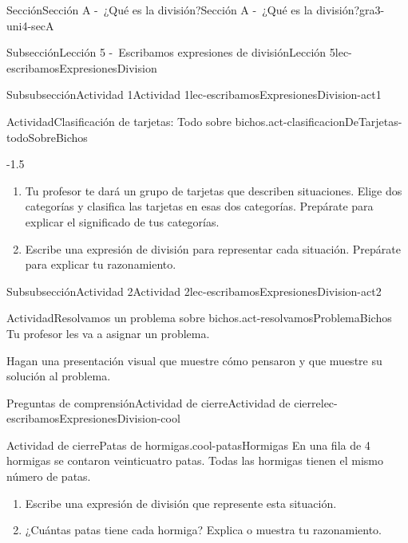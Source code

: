 \documentclass[twoside,10pt,]{article}
\begin{document}
\begin{sectionptx}{Sección}{Sección A -~¿Qué es la división?}{}{Sección A -~¿Qué es la división?}{}{}{gra3-uni4-secA}
\begin{subsectionptx}{Subsección}{Lección 5 -~Escribamos expresiones de división}{}{Lección 5}{}{}{lec-escribamosExpresionesDivision}
\begin{subsubsectionptx}{Subsubsección}{Actividad 1}{}{Actividad 1}{}{}{lec-escribamosExpresionesDivision-act1}
\begin{activity}{Actividad}{Clasificación de tarjetas: Todo sobre bichos.}{act-clasificacionDeTarjetas-todoSobreBichos}
\begin{image}{0.3}{0.4}{0.3}{-1.5\baselineskip}
\end{image}%
%
\begin{enumerate}
\item{}Tu profesor te dará un grupo de tarjetas que describen situaciones. Elige dos categorías y clasifica las tarjetas en esas dos categorías. Prepárate para explicar el significado de tus categorías.%
\item{}Escribe una expresión de división para representar cada situación. Prepárate para explicar tu razonamiento.%
\end{enumerate}
\end{activity}%
%
\end{subsubsectionptx}
%
%
\typeout{************************************************}
\typeout{************************************************}
%
\begin{subsubsectionptx}{Subsubsección}{Actividad 2}{}{Actividad 2}{}{}{lec-escribamosExpresionesDivision-act2}
\begin{activity}{Actividad}{Resolvamos un problema sobre bichos.}{act-resolvamosProblemaBichos}%
Tu profesor les va a asignar un problema.%
\par
Hagan una presentación visual que muestre cómo pensaron y que muestre su solución al problema.%
\end{activity}%
\end{subsubsectionptx}
%
%
\typeout{************************************************}
\typeout{************************************************}
%
\begin{reading-questions-subsubsection}{Preguntas de comprensión}{Actividad de cierre}{}{Actividad de cierre}{}{}{lec-escribamosExpresionesDivision-cool}
\begin{project}{Actividad de cierre}{Patas de hormigas.}{cool-patasHormigas}%
En una fila de 4 hormigas se contaron veinticuatro patas. Todas las hormigas tienen el mismo número de patas.%
\par
%
\begin{enumerate}[label={(\alph*)}]
\item{}Escribe una expresión de división que represente esta situación.%
\item{}¿Cuántas patas tiene cada hormiga? Explica o muestra tu razonamiento.%
\end{enumerate}
%
\end{project}%

\end{reading-questions-subsubsection}
\end{subsectionptx}
\end{sectionptx}
\end{document}
